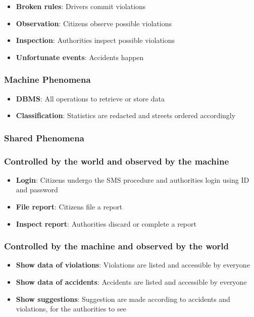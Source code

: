 \begin{itemize}
    \item \textbf{Broken rules}: Drivers commit violations
    \item \textbf{Observation}: Citizens observe possible violations
    \item \textbf{Inspection}: Authorities inspect possible violations 
    \item \textbf{Unfortunate events}: Accidents happen
\end{itemize}

\subsubsection{Machine Phenomena}

\begin{itemize}
    \item \textbf{DBMS}: All operations to retrieve or store data
    \item \textbf{Classification}: Statistics are redacted and 
    streets ordered accordingly
\end{itemize}

\subsubsection{Shared Phenomena}

\subsubsection*{Controlled by the world and observed by the machine}

\begin{itemize}
    \item \textbf{Login}: Citizens undergo the SMS procedure and authorities 
    login using ID and password
    \item \textbf{File report}: Citizens file a report
    \item \textbf{Inspect report}: Authorities discard or complete a report
\end{itemize}

\subsubsection*{Controlled by the machine and observed by the world}

\begin{itemize}
    \item \textbf{Show data of violations}: Violations are listed and 
    accessible by everyone
    \item \textbf{Show data of accidents}: Accidents are listed and accessible 
    by everyone
    \item \textbf{Show suggestions}: Suggestion are made according to accidents 
    and violations, for the authorities to see
\end{itemize}


